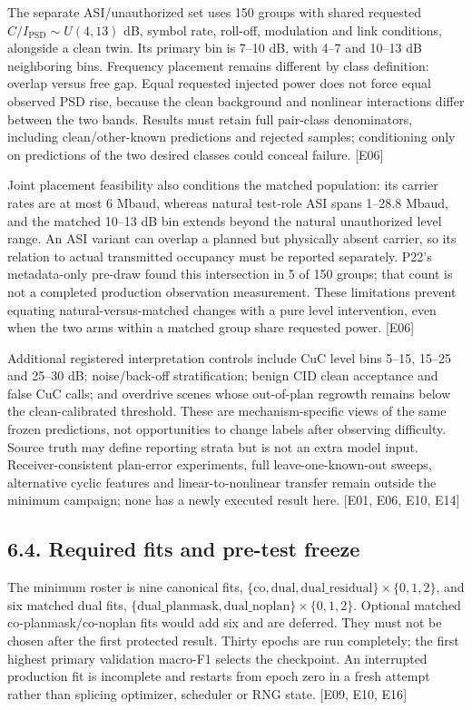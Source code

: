 \documentclass[
  10pt,
]{article}
\begin{document}
The separate ASI/unauthorized set uses 150 groups with shared requested
\(C/I_{\mathrm{PSD}}\sim U(4,13)\) dB, symbol rate, roll-off, modulation
and link conditions, alongside a clean twin. Its primary bin is 7--10
dB, with 4--7 and 10--13 dB neighboring bins. Frequency placement
remains different by class definition: overlap versus free gap. Equal
requested injected power does not force equal observed PSD rise, because
the clean background and nonlinear interactions differ between the two
bands. Results must retain full pair-class denominators, including
clean/other-known predictions and rejected samples; conditioning only on
predictions of the two desired classes could conceal failure. {[}E06{]}

Joint placement feasibility also conditions the matched population: its
carrier rates are at most 6 Mbaud, whereas natural test-role ASI spans
1--28.8 Mbaud, and the matched 10--13 dB bin extends beyond the natural
unauthorized level range. An ASI variant can overlap a planned but
physically absent carrier, so its relation to actual transmitted
occupancy must be reported separately. P22's metadata-only pre-draw
found this intersection in 5 of 150 groups; that count is not a
completed production observation measurement. These limitations prevent
equating natural-versus-matched changes with a pure level intervention,
even when the two arms within a matched group share requested power.
{[}E06{]}

Additional registered interpretation controls include CuC level bins
5--15, 15--25 and 25--30 dB; noise/back-off stratification; benign CID
clean acceptance and false CuC calls; and overdrive scenes whose
out-of-plan regrowth remains below the clean-calibrated threshold. These
are mechanism-specific views of the same frozen predictions, not
opportunities to change labels after observing difficulty. Source truth
may define reporting strata but is not an extra model input.
Receiver-consistent plan-error experiments, full leave-one-known-out
sweeps, alternative cyclic features and linear-to-nonlinear transfer
remain outside the minimum campaign; none has a newly executed result
here. {[}E01, E06, E10, E14{]}

\subsection{6.4. Required fits and pre-test
freeze}\label{required-fits-and-pre-test-freeze}

The minimum roster is nine canonical fits,
\(\{\mathrm{co,dual,dual\_residual}\}\times\{0,1,2\}\), and six matched
dual fits, \(\{\mathrm{dual\_planmask,dual\_noplan}\}\times\{0,1,2\}\).
Optional matched co-planmask/co-noplan fits would add six and are
deferred. They must not be chosen after the first protected result.
Thirty epochs are run completely; the first highest primary validation
macro-F1 selects the checkpoint. An interrupted production fit is
incomplete and restarts from epoch zero in a fresh attempt rather than
splicing optimizer, scheduler or RNG state. {[}E09, E10, E16{]}
\end{document}
